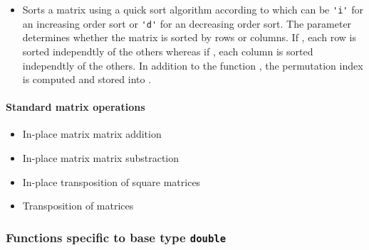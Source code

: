 \begin{itemize}
\item {}
  \sshortdescribe Sorts a matrix using a quick sort algorithm according to
   which can be \verb!'i'! for an increasing order sort or
  \verb!'d'! for an decreasing order sort. The parameter  determines
  whether the matrix is sorted by rows or columns. If , each row
  is sorted independtly of the others whereas if , each column
  is sorted independtly of the others. In addition to the function
  , the permutation index is computed and stored into 
  .
\end{itemize}


\paragraph{Standard matrix operations}
\begin{itemize}
\item {} 
  \sshortdescribe In-place matrix matrix addition  

\item {} 
  \sshortdescribe In-place matrix matrix substraction  
  
\item {}
  \sshortdescribe In-place transposition of square matrices  

\item {} 
  \sshortdescribe Transposition of matrices
\end{itemize}

\subsubsection{Functions specific to base type {\tt double}}

